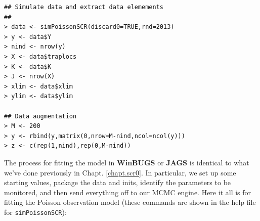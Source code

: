 \begin{samepage}
{\small
\begin{verbatim}
## Simulate data and extract data elemements
##
> data <- simPoissonSCR(discard0=TRUE,rnd=2013)
> y <- data$Y
> nind <- nrow(y)
> X <- data$traplocs
> K <- data$K
> J <- nrow(X)
> xlim <- data$xlim
> ylim <- data$ylim

## Data augmentation
> M <- 200
> y <- rbind(y,matrix(0,nrow=M-nind,ncol=ncol(y)))
> z <- c(rep(1,nind),rep(0,M-nind))
\end{verbatim}
}
\end{samepage}

The process for fitting
the model in {\bf WinBUGS} or {\bf JAGS} is identical to what we've done
previously in Chapt. \ref{chapt.scr0}. In particular, we set up some
starting values, package the data and inits, identify the parameters
to be monitored, and then send everything off to our MCMC engine. Here
it all is for fitting the Poisson observation model (these commands
are shown in the help file for \mbox{\tt simPoissonSCR}):

